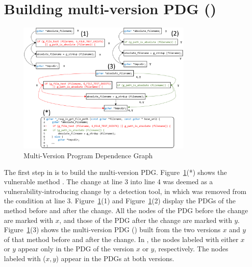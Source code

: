 \section{Building multi-version PDG ({\mvpdgxy})}
\label{delta:sec}

\begin{figure}[t]
	\centering
	\includegraphics[width=3.4in]{graphs/multi-version-pdg.png}
	\vspace{-8pt}
	\caption{Multi-Version Program Dependence Graph}
        \vspace{-12pt}
	\label{fig:multi-version-pdg}
\end{figure}

The first step in {\tool} is to build the multi-version PDG.
Figure~\ref{fig:multi-version-pdg}(*) shows the vulnerable method
. The change at line 3 into line 4 was
deemed as a vulnerability-introducing change by a detection tool, in
which   was
removed from the condition at line
3. Figure~\ref{fig:multi-version-pdg}(1)
and Figure~\ref{fig:multi-version-pdg}(2) display the PDGs of the method
 before and after the change. All the
nodes of the PDG before the change are marked with $x$, and those of
the PDG after the change are marked with
$y$. Figure~\ref{fig:multi-version-pdg}(3) shows the multi-version
PDG ({\mvpdgxy}) built from the two versions $x$ and
$y$ of that method before and after the change. In {\mvpdgxy}, the
nodes labeled with either $x$ or $y$ appear only in the PDG of the
version $x$ or $y$, respectively. The nodes labeled with ($x,y$)
appear in the PDGs at both versions.



